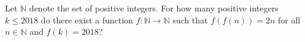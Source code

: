 Let $\mathbb{N}$ denote the set of positive integers. For how many positive integers $k\le 2018$ do there exist a function $f: \mathbb{N}\to \mathbb{N}$ such that $f(f(n))=2n$ for all $n\in \mathbb{N}$ and $f(k)=2018$?
